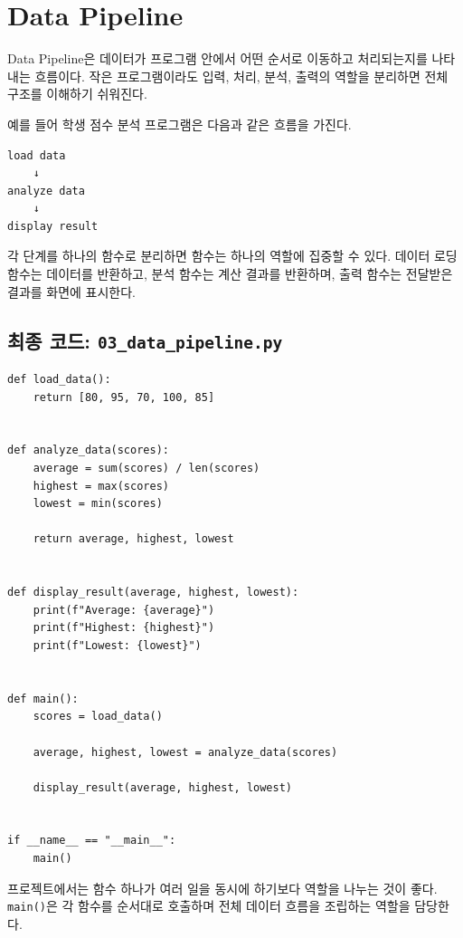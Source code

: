 \documentclass[11pt,a4paper]{article}
\begin{document}
\section{Data Pipeline}

Data Pipeline은 데이터가 프로그램 안에서 어떤 순서로 이동하고 처리되는지를 나타내는 흐름이다. 작은 프로그램이라도 입력, 처리, 분석, 출력의 역할을 분리하면 전체 구조를 이해하기 쉬워진다.

예를 들어 학생 점수 분석 프로그램은 다음과 같은 흐름을 가진다.

\begin{verbatim}
load data
    ↓
analyze data
    ↓
display result
\end{verbatim}

각 단계를 하나의 함수로 분리하면 함수는 하나의 역할에 집중할 수 있다. 데이터 로딩 함수는 데이터를 반환하고, 분석 함수는 계산 결과를 반환하며, 출력 함수는 전달받은 결과를 화면에 표시한다.

\subsection{최종 코드: \texttt{03\_data\_pipeline.py}}

\begin{lstlisting}
def load_data():
    return [80, 95, 70, 100, 85]


def analyze_data(scores):
    average = sum(scores) / len(scores)
    highest = max(scores)
    lowest = min(scores)

    return average, highest, lowest


def display_result(average, highest, lowest):
    print(f"Average: {average}")
    print(f"Highest: {highest}")
    print(f"Lowest: {lowest}")


def main():
    scores = load_data()

    average, highest, lowest = analyze_data(scores)

    display_result(average, highest, lowest)


if __name__ == "__main__":
    main()
\end{lstlisting}

\begin{importantbox}
프로젝트에서는 함수 하나가 여러 일을 동시에 하기보다 역할을 나누는 것이 좋다. \texttt{main()}은 각 함수를 순서대로 호출하며 전체 데이터 흐름을 조립하는 역할을 담당한다.
\end{importantbox}
\end{document}
